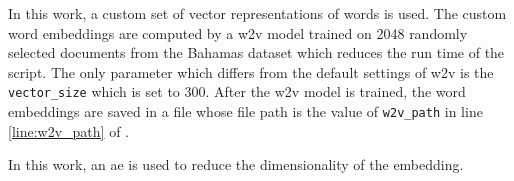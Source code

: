 In this work, a custom set of vector representations of words is used.
The custom word embeddings are computed by a \ac{w2v} model trained on 2048 randomly selected documents from the Bahamas dataset 
which reduces the run time of the script.
The only parameter which differs from the default settings of \ac{w2v} is the \texttt{vector\_size} which is set to 300.
After the \ac{w2v} model is trained, the word embeddings are saved in a file 
whose file path is the value of \texttt{w2v\_path} in line \ref{line:w2v_path} of .

In this work, an \ac{ae} is used to reduce the dimensionality of the \infersent{} embedding.
